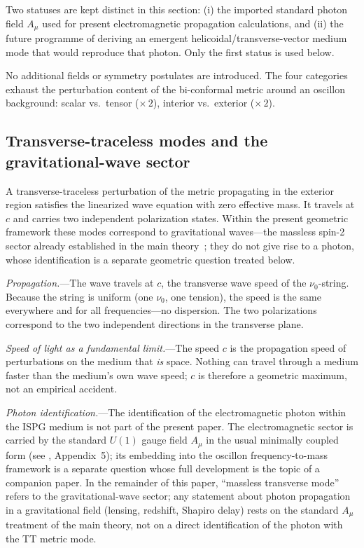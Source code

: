 \documentclass[11pt]{article}
\begin{document}
\medskip
Two statuses are kept distinct in this section:
(i) the imported standard photon field $A_\mu$
used for present electromagnetic propagation
calculations, and (ii) the future programme of
deriving an emergent helicoidal/transverse-vector
medium mode that would reproduce that photon.
Only the first status is used below.

No additional fields or symmetry postulates
are introduced.  The four categories exhaust the
perturbation content of the bi-conformal metric
around an oscillon background: scalar vs.\
tensor ($\times\,2$), interior vs.\ exterior
($\times\,2$).

\subsection{Transverse-traceless modes and the
gravitational-wave sector}
\label{sec:photon}

A transverse-traceless perturbation of the metric
propagating in the exterior region satisfies the
linearized wave equation with zero effective mass.
It travels at $c$ and carries two independent
polarization states.  Within the present geometric
framework these modes correspond to
gravitational waves---the massless spin-2 sector
already established in the main
theory~\cite{Lotishvili2026}; they do not give
rise to a photon, whose identification is a
separate geometric question treated below.

\textit{Propagation.}---The wave travels at
$c$, the transverse wave speed of the
$\nu_0$-string.  Because the string is uniform
(one $\nu_0$, one tension), the speed is the
same everywhere and for all frequencies---no
dispersion.  The two polarizations correspond to
the two independent directions in the transverse
plane.

\textit{Speed of light as a fundamental
limit.}---The speed $c$ is the propagation speed
of perturbations on the medium that \emph{is}
space.  Nothing can travel through a medium
faster than the medium's own wave speed;
$c$ is therefore a geometric maximum, not
an empirical accident.

\textit{Photon identification.}---The
identification of the electromagnetic photon
within the ISPG medium is not part of the present
paper.  The electromagnetic sector is carried by
the standard $U(1)$ gauge field $A_\mu$ in the
usual minimally coupled form (see
\cite{Lotishvili2026}, Appendix~5); its embedding
into the oscillon frequency-to-mass framework is a
separate question whose full development is the
topic of a companion paper.  In the remainder of
this paper, ``massless transverse mode'' refers to
the gravitational-wave sector; any statement about
photon propagation in a gravitational field
(lensing, redshift, Shapiro delay) rests on the
standard $A_\mu$ treatment of the main theory, not
on a direct identification of the photon with the
TT metric mode.
\end{document}
